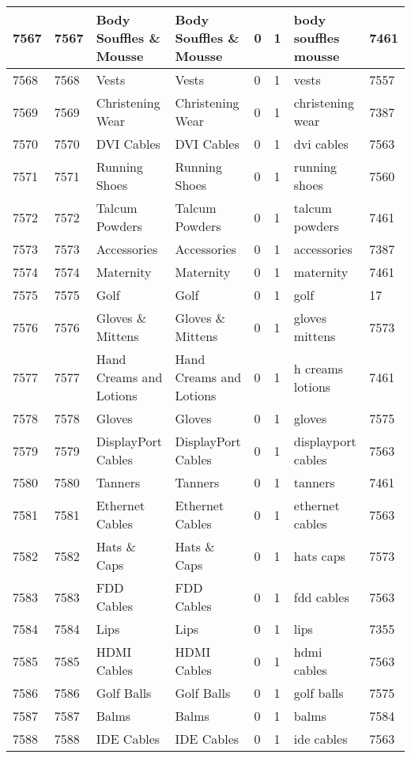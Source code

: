 \begin{longtable}{|l|l|l|l|l|l|l|l|}
7567 & 7567 & Body Souffles \& Mousse & Body Souffles \& Mousse & 0 & 1 & body souffles mousse & 7461 \\ \hline 
7568 & 7568 & Vests & Vests & 0 & 1 & vests & 7557 \\ \hline 
7569 & 7569 & Christening Wear & Christening Wear & 0 & 1 & christening wear & 7387 \\ \hline 
7570 & 7570 & DVI Cables & DVI Cables & 0 & 1 & dvi cables & 7563 \\ \hline 
7571 & 7571 & Running Shoes & Running Shoes & 0 & 1 & running shoes & 7560 \\ \hline 
7572 & 7572 & Talcum Powders & Talcum Powders & 0 & 1 & talcum powders & 7461 \\ \hline 
7573 & 7573 & Accessories & Accessories & 0 & 1 & accessories & 7387 \\ \hline 
7574 & 7574 & Maternity & Maternity & 0 & 1 & maternity & 7461 \\ \hline 
7575 & 7575 & Golf & Golf & 0 & 1 & golf & 17 \\ \hline 
7576 & 7576 & Gloves \& Mittens & Gloves \& Mittens & 0 & 1 & gloves mittens & 7573 \\ \hline 
7577 & 7577 & Hand Creams and Lotions & Hand Creams and Lotions & 0 & 1 & h creams lotions & 7461 \\ \hline 
7578 & 7578 & Gloves & Gloves & 0 & 1 & gloves & 7575 \\ \hline 
7579 & 7579 & DisplayPort Cables & DisplayPort Cables & 0 & 1 & displayport cables & 7563 \\ \hline 
7580 & 7580 & Tanners & Tanners & 0 & 1 & tanners & 7461 \\ \hline 
7581 & 7581 & Ethernet Cables & Ethernet Cables & 0 & 1 & ethernet cables & 7563 \\ \hline 
7582 & 7582 & Hats \& Caps & Hats \& Caps & 0 & 1 & hats caps & 7573 \\ \hline 
7583 & 7583 & FDD Cables & FDD Cables & 0 & 1 & fdd cables & 7563 \\ \hline 
7584 & 7584 & Lips & Lips & 0 & 1 & lips & 7355 \\ \hline 
7585 & 7585 & HDMI Cables & HDMI Cables & 0 & 1 & hdmi cables & 7563 \\ \hline 
7586 & 7586 & Golf Balls & Golf Balls & 0 & 1 & golf balls & 7575 \\ \hline 
7587 & 7587 & Balms & Balms & 0 & 1 & balms & 7584 \\ \hline 
7588 & 7588 & IDE Cables & IDE Cables & 0 & 1 & ide cables & 7563 \\ \hline 

\end{longtable}
